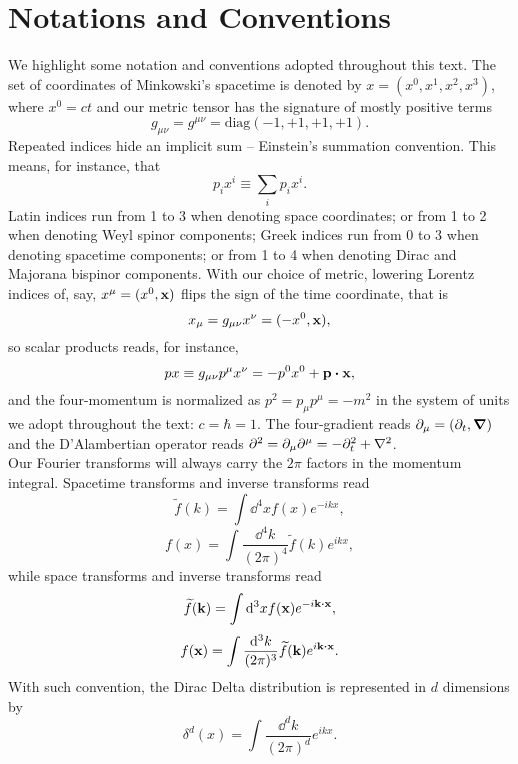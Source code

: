 \chapter*{Notations and Conventions}
We highlight some notation and conventions adopted throughout this text. The set of coordinates of Minkowski's spacetime is denoted by $x=(x^0,x^1,x^2,x^3)$, where $x^0=ct$ and our metric tensor has the signature of mostly positive terms
\begin{equation*}
    g_{\mu\nu}=g^{\mu\nu}=\text{diag}(-1,+1,+1,+1).
\end{equation*}
Repeated indices hide an implicit sum -- Einstein's summation convention. This means, for instance, that
\begin{equation*}
    p_ix^i\equiv\sum_i p_ix^i.
\end{equation*}
Latin indices run from 1 to 3 when denoting space coordinates; or from 1 to 2 when denoting Weyl spinor components; Greek indices run from 0 to 3 when denoting spacetime components;  or from 1 to 4 when denoting Dirac and Majorana bispinor components. With our choice of metric, lowering Lorentz indices of, say, $x^\mu=(x^0,\vb{x})$ flips the sign of the time coordinate, that is
\begin{equation*}
    x_\mu=g_{\mu\nu}x^\nu=(-x^0,\vb{x}),
\end{equation*}
so scalar products reads, for instance,
\begin{equation*}
    px\equiv g_{\mu\nu}p^\mu x^\nu =-p^0x^0+\vb{p}\vdot\vb{x},
\end{equation*}
and the four-momentum is normalized as $p^2=p_\mu p^\mu=-m^2$ in the system of units we adopt throughout the text: $c=\hbar=1$.
The four-gradient reads $\partial_\mu=(\partial_t,\grad)$ and the D'Alambertian operator reads $\partial^2=\partial_\mu\partial^\mu=-\partial_t^2+\laplacian$.\\

Our Fourier transforms will always carry the $2\pi$ factors in the momentum integral. Spacetime transforms and inverse transforms read
\begin{equation*}
    \widetilde f({k})=\int{\dd ^4x} {f}({x})e^{-i{k}{x}},
\end{equation*}
\begin{equation*}
    f({x})=\int\frac{\dd ^4 k}{(2\pi)^4} \widetilde{f}({k})e^{i{k}{x}},
\end{equation*}
while space transforms and inverse transforms read
\begin{equation*}
    \widetilde f({\vb{k}})=\int{\dd ^3x} {f}(\vb{x})e^{-i{\vb{k}}\vdot\vb{x}},
\end{equation*}
\begin{equation*}
    f(\vb{x})=\int\frac{\dd ^3 k}{(2\pi)^3} \widetilde{f}(\vb{k})e^{i\vb{k}\vdot\vb{x}}.
\end{equation*}
With such convention, the Dirac Delta distribution is represented in $d$ dimensions by
\begin{equation*}
    \delta^d(x)=\int\frac{\dd^dk}{(2\pi)^d}e^{ikx}.
\end{equation*}

